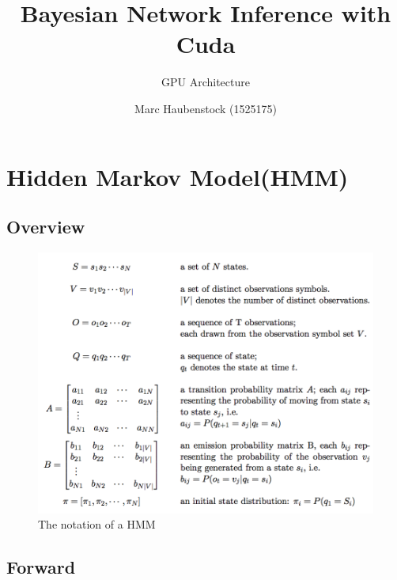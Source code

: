 \documentclass[english, paper=a4]{scrartcl}
\begin{document}
\graphicspath{{images/}}


\title{Bayesian Network Inference with Cuda} 

\subtitle{GPU Architecture} 

\author{Marc Haubenstock (1525175)}




\maketitle

\section{Hidden Markov Model(HMM)}

\subsection{Overview}

\begin{figure}[H]
\centering

\includegraphics[scale=0.4]{"symbols"}
  \caption{The notation of a HMM \cite{cuhmm}}
\end{figure}


\subsection{Forward}
\end{document}
